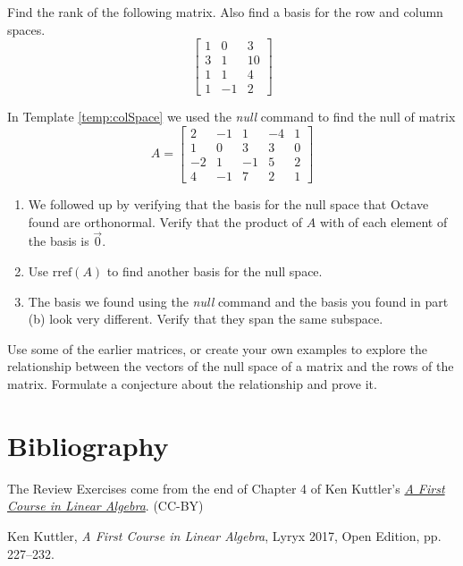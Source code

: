 \documentclass{ximera}
\begin{document}
\begin{problem}\label{prb:5.35} Find the rank of the following matrix. Also find a basis for the row and column spaces.
\begin{equation*}
\left[
\begin{array}{rrr}
1 & 0 & 3 \\
3 & 1 & 10 \\
1 & 1 & 4 \\
1 & -1 & 2
\end{array}
\right]
\end{equation*}

\end{problem}

\begin{problem}\label{prob_oct_Rn1}
    In Template \ref{temp:colSpace} we used the \emph{null} command to find the null of matrix $$A=\begin{bmatrix}2&-1&1&-4&1\\1&0&3&3&0\\-2&1&-1&5&2\\4&-1&7&2&1\end{bmatrix}$$ 

    \begin{enumerate}
        \item We followed up by verifying that the basis for the null space that Octave found are orthonormal.  Verify that the product of $A$ with of each element of the basis is $\vec{0}$.
        \item Use $\text{rref}(A)$ to find another basis for the null space.  
        \item The basis we found using the \emph{null} command and the basis you found in part (b) look very different.  Verify that they span the same subspace.
    \end{enumerate}
\end{problem}

\begin{problem}\label{prob_oct_Rn2}
    Use some of the earlier matrices, or create your own examples to explore the relationship between the vectors of the null space of a matrix and the rows of the matrix.  Formulate a conjecture about the relationship and prove it.
\end{problem}

\section*{Bibliography}
The Review Exercises come from the end of Chapter 4 of Ken Kuttler's \href{https://open.umn.edu/opentextbooks/textbooks/a-first-course-in-linear-algebra-2017}{\it A First Course in Linear Algebra}. (CC-BY)

Ken Kuttler, {\it  A First Course in Linear Algebra}, Lyryx 2017, Open Edition, pp. 227--232.  
\end{document}

